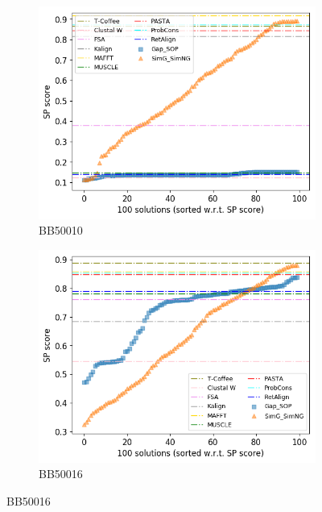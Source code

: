 \begin{figure}[!htbp]
\begin{adjustwidth}{-1cm}{-1cm}
\begin{subfigure}{0.22\textwidth}
		\end{subfigure}
		\begin{subfigure}{0.22\textwidth}
			\includegraphics[width=\columnwidth]{Figure/summary/precomputedInit/Balibase/BB50010_pairs_density_single_run_2}
			\caption{BB50010}
		\end{subfigure}
		\begin{subfigure}{0.22\textwidth}
			\includegraphics[width=\columnwidth]{Figure/summary/precomputedInit/Balibase/BB50016_pairs_density_single_run_2}
			\caption{BB50016}
		\end{subfigure}
		

\end{adjustwidth}
\end{figure}

